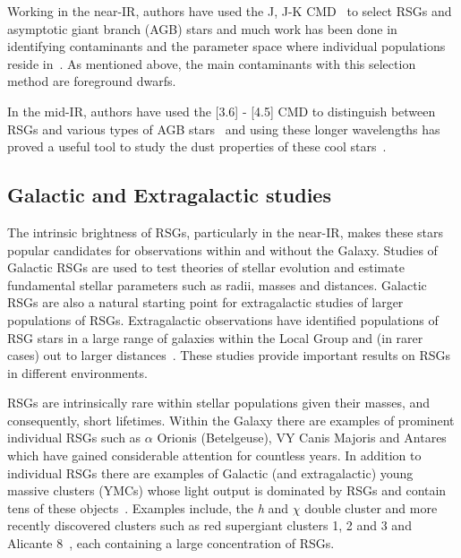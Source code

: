 Working in the near-IR, authors have used the J, J-K CMD~\citep[e.g.][]{2000ApJ...542..804N,2006A&A...452..195C,Neugent12,2015ApJ...803...14P} to select RSGs and asymptotic giant branch (AGB) stars and much work has been done in identifying contaminants and the parameter space where individual populations reside in~\citep{2006A&A...452..195C}.
As mentioned above, the main contaminants with this selection method are foreground dwarfs.

In the mid-IR, authors have used the [3.6] - [4.5] CMD to distinguish between RSGs and various types of AGB stars~\citep{2006AJ....132.2034B,2014A&A...562A..75B,2015A&A...584A..33B,2015ApJ...800...51B,2015A&A...578A.100W} and using these longer wavelengths has proved a useful tool to study the dust properties of these cool stars~\citep{Beasor-prep}.



\subsection{Galactic and Extragalactic studies} %
\label{sub:galactic_and_extragalactic}

The intrinsic brightness of RSGs, particularly in the near-IR, makes these stars popular candidates for observations within and without the Galaxy.
Studies of Galactic RSGs are used to test theories of stellar evolution and estimate fundamental stellar parameters such as radii, masses and distances.
Galactic RSGs are also a natural starting point for extragalactic studies of larger populations of RSGs.
Extragalactic observations have identified populations of RSG stars in a large range of galaxies within the Local Group and (in rarer cases) out to larger distances~\citep[e.g.][and see Chapter~\ref{ch:ngc55}]{Elias85,Humphreys86, Massey06, 2007AJ....134.2474M, Groenewegen09,Massey13,2015ApJ...805..182G}.
These studies provide important results on RSGs in different environments.


RSGs are intrinsically rare within stellar populations given their masses, and consequently, short lifetimes.
Within the Galaxy there are examples of prominent individual RSGs such as $\alpha$ Orionis (Betelgeuse), VY Canis Majoris and Antares which have gained considerable attention for countless years.\footnotemark
In addition to individual RSGs there are examples of Galactic (and extragalactic) young massive clusters (YMCs) whose light output is dominated by RSGs and contain tens of these objects~\citep{2014ApJ...788...58G}.
Examples include, the {\it h} and $\chi$ double cluster and more recently discovered clusters such as  red supergiant clusters 1, 2 and 3 and Alicante 8~\citep[RSGC01, RSGC02, RSGC03;][respectively; \citealt{2010A&A...513A..74N}]{2006ApJ...643.1166F,2007ApJ...671..781D,2009A&A...498..109C}, each containing a large concentration of RSGs.

